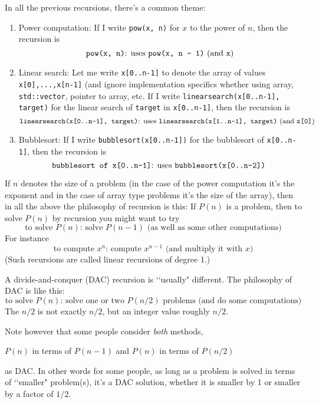 In all the previous recursions, there's a common theme:
\begin{enumerate}[nosep]
\item Power computation: If I write \texttt{pow(x, n)} for $x$
to the power of $n$,
then the recursion is
\[
\text{\texttt{pow(x, n)}: uses \texttt{pow(x, n - 1)} (and \texttt{x})}
\]
\item Linear search: Let me write \texttt{x[0..n-1]}
to denote the array
of values \texttt{x[0],...,x[n-1]}
(and ignore implementation specifics
whether using array, \verb!std::vector!, pointer to array, etc.
If I write \verb!linearsearch(x[0..n-1], target)! for the
linear search of \verb!target!
in \verb!x[0..n-1]!, then the recursion is
{\small
\[
\text{\texttt{linearsearch(x[0..n-1], target)}: uses
\texttt{linearsearch(x[1..n-1], target)} (and \texttt{x[0]})}
\]
}
\item Bubblesort:  
If I write \verb!bubblesort(x[0..n-1])! for the bubblesort of
\verb!x[0..n-1]!, then the recursion is
\[
\text{\texttt{bubblesort of x[0..n-1]}: uses
\texttt{bubblesort(x[0..n-2])}
}
\]
\end{enumerate}
If $n$ denotes the size of a problem (in the case of the power computation
it's the exponent and in the case of array type problems it's the size of the
array), then in all the above the philosophy of recursion is this:
If $P(n)$ is a problem, then to solve $P(n)$ by recursion you might want to try
\[
\text{to solve $P(n)$: solve $P(n-1)$ (as well as some other computations)}
\]
For instance
\[
\text{to compute $x^n$: compute $x^{n-1}$ (and multiply it with $x$)}
\]
(Such recursions are called linear recursions of degree 1.)

A divide-and-conquer (DAC) recursion is \lq\lq usually" different.
The philosophy of DAC is like this:
\[
\text{to solve $P(n)$: solve one or two $P(n/2)$ problems (and do some computations)}
\]
The $n/2$ is not exactly $n/2$, but an integer value roughly $n/2$.

Note however that
some people consider \textit{both} methods,
\begin{tightlist}
\li $P(n)$ in terms of $P(n-1)$ and
\li $P(n)$ in terms of $P(n/2)$
\end{tightlist}
as DAC.
In other words for some people, as long as a problem is solved
in terms
of \lq\lq smaller" problem(s), it's a DAC solution,
whether it is smaller by 1 or smaller by a factor of $1/2$.


